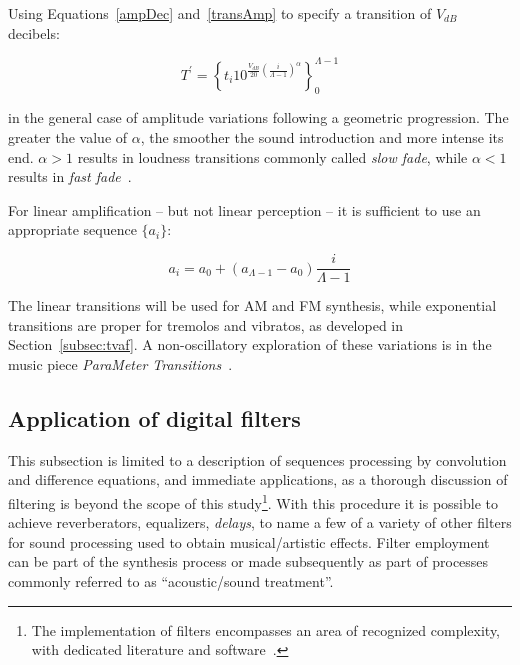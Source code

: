 Using Equations~\ref{ampDec} and~\ref{transAmp} to specify a transition of $V_{dB}$ decibels:

\begin{equation}\label{seqAmpDB}
T^{'}=\left\{ t_i 10^{\frac{V_{dB}}{20}\left( \frac{i}{\Lambda-1} \right)^\alpha} \right\}_0^{\Lambda-1}
\end{equation}

\noindent in the general case of amplitude variations following a geometric progression. The greater the value of $\alpha$, the smoother the sound introduction and more intense its end. $\alpha>1$ results in loudness transitions commonly called \emph{slow fade}, while $\alpha<1$ results in \emph{fast fade}~\cite{guillaume}.

For linear amplification -- but not linear perception -- it is sufficient to use an appropriate sequence $\{a_i\}$:

\begin{equation}\label{seqAmpLin}
a_i=a_0 + (a_{\Lambda-1}-a_0)\frac{i}{\Lambda-1}
\end{equation}

The linear transitions will be used for AM and FM synthesis, while exponential transitions are proper for tremolos and vibratos, as developed in Section~\ref{subsec:tvaf}. A non-oscillatory exploration of these variations is in the music piece \emph{ParaMeter Transitions}~\cite{MASSA}.

\subsection{Application of digital filters}\label{subsec:filtros}
This subsection is limited to a description of sequences processing by convolution and difference equations, and immediate applications, as a thorough discussion of filtering is beyond the scope of this study\footnote{The implementation of filters encompasses an area of recognized complexity, with dedicated literature and software~\cite{Openheim,smith}.}.
With this procedure it is possible to achieve reverberators, equalizers, \emph{delays}, to name a few of a variety of other filters for sound processing used to obtain musical/artistic effects.
Filter employment can be part of the synthesis process or made subsequently as part of processes commonly referred to as ``acoustic/sound treatment''.


